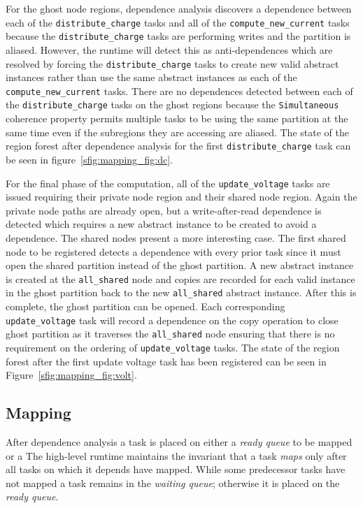 For the ghost node regions, dependence analysis discovers 
a dependence between each of the {\tt distribute\_charge} tasks and all of the
{\tt compute\_new\_current} tasks because the {\tt distribute\_charge} tasks are
performing writes and the partition is aliased.  However, the runtime will detect this as
anti-dependences which are resolved by forcing the {\tt distribute\_charge} tasks to
create new valid abstract instances rather than use the same abstract instances as
each of the {\tt compute\_new\_current} tasks.  There are no dependences detected
between each of the {\tt distribute\_charge} tasks on the ghost regions because
the {\tt Simultaneous} coherence property permits multiple tasks to be using the same
partition at the same time even if the subregions they are accessing are aliased.  The
state of the region forest after dependence analysis for the first {\tt distribute\_charge} task can
be seen in figure~\ref{sfig:mapping_fig:dc}.

For the final phase of the computation, all of the {\tt update\_voltage} tasks
are issued requiring their private node region and their shared node region.  Again
the private node paths are already open, but a write-after-read dependence is detected which
requires a new abstract instance to be created to avoid a dependence.  The
shared nodes present a more interesting case.  The first shared node to be registered
detects a dependence with every prior task since it must open the shared partition
instead of the ghost partition.  A new abstract instance is created at the 
{\tt all\_shared} node and copies are recorded for each valid instance in the ghost partition
back to the new {\tt all\_shared} abstract instance.  After this is complete, the
ghost partition can be opened.  Each corresponding {\tt update\_voltage} task will record
a dependence on the copy operation to close ghost partition as it traverses the {\tt all\_shared}
node ensuring that there is no requirement on the ordering of {\tt update\_voltage}
tasks.  The state of the region forest after the first update voltage task
has been registered can be seen in Figure~\ref{sfig:mapping_fig:volt}.

\subsection{Mapping}
\label{subsec:mapping}
After dependence analysis a task is placed on either a {\em ready queue} to be mapped or a 
The high-level runtime maintains the invariant that a task {\em maps} only after all tasks on which it depends have mapped. 
While some predecessor tasks have not mapped a task remains in the {\em waiting queue}; otherwise it is placed on the {\em ready queue}.  

